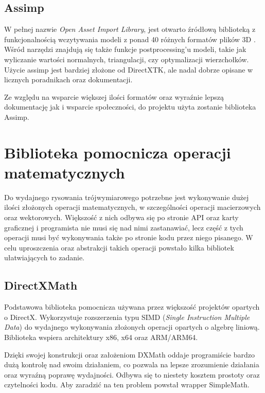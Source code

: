\subsection{Assimp}

W pełnej nazwie \emph{Open Asset Import Library}, jest otwarto źródłową
biblioteką z funkcjonalnością wczytywania modeli z ponad 40 różnych
formatów plików 3D \cite{github:assimp:2024}. Wśród narzędzi znajdują się także funkcje
postprocessing'u modeli, takie jak wyliczanie wartości normalnych,
triangulacji, czy optymalizacji wierzchołków. Użycie assimp jest bardziej złożone od DirectXTK, ale nadal dobrze
opisane w licznych poradnikach oraz dokumentacji.

Ze względu na wsparcie większej ilości formatów oraz wyraźnie lepszą
dokumentację jak i wsparcie społeczności, do projektu użyta zostanie
biblioteka Assimp.

\section{Biblioteka pomocnicza operacji matematycznych}

Do wydajnego rysowania trójwymiarowego potrzebne jest wykonywanie dużej
ilości złożonych operacji matematycznych, w szczególności operacji
macierzowych oraz wektorowych. Większość z nich odbywa się po stronie
API oraz karty graficznej i programista nie musi się nad nimi
zastanawiać, lecz część z tych operacji musi być wykonywania także po
stronie kodu przez niego pisanego. W celu uproszczenia oraz abstrakcji
takich operacji powstało kilka bibliotek ułatwiających to zadanie.

\subsection{DirectXMath}

Podstawowa biblioteka pomocnicza używana przez większość projektów
opartych o DirectX. Wykorzystuje rozszerzenia typu SIMD (\emph{Single
Instruction Multiple Data}) do wydajnego wykonywania złożonych operacji
opartych o algebrę liniową. Biblioteka wspiera architektury x86, x64
oraz ARM/ARM64.

Dzięki swojej konstrukcji oraz założeniom DXMath oddaje programiście
bardzo dużą kontrolę nad swoim działaniem, co pozwala na lepsze
zrozumienie działania oraz wyraźną poprawę wydajności. Odbywa się to
niestety kosztem prostoty oraz czytelności kodu. Aby zaradzić na ten
problem powstał wrapper SimpleMath.

